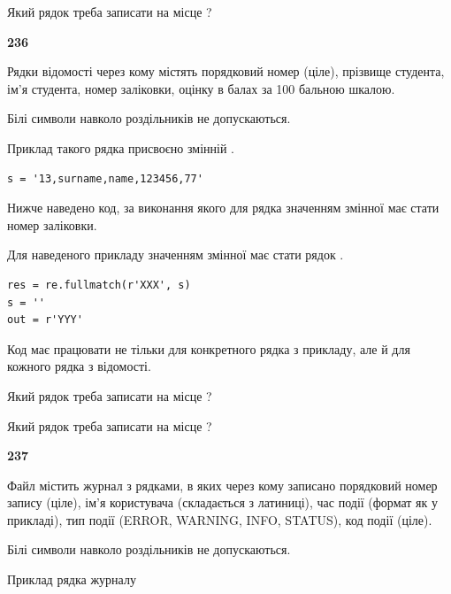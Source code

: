 Який рядок треба записати на місце  ?\par


\newpage

{\begin {center}\textbf{ 236}\end {center}}\par
Рядки відомості через кому містять порядковий номер (ціле), пріз\-ви\-ще студен\-та, ім'я студента, номер заліковки, оцінку в балах за 100 бальною шкалою.

Білі символи навколо роздільників не допускаються.

Приклад такого рядка присвоєно змінній .



\begin{verbatim}
s = '13,surname,name,123456,77'
\end{verbatim}


Нижче наведено код, за виконання якого для рядка  значенням змінної  має стати номер заліковки.

Для наведеного прикладу значенням змінної  має стати рядок  .



\begin{verbatim}
res = re.fullmatch(r'XXX', s)
s = ''
out = r'YYY'
\end{verbatim}


Код має працювати не тільки для конкретного рядка з прикладу, але й для кожного рядка з відомості.




Який рядок треба записати на місце  ?\par
\vspace{5mm}


Який рядок треба записати на місце  ?\par


\newpage

{\begin {center}\textbf{ 237}\end {center}}\par
Файл  містить журнал з рядками, в яких через кому записано поряд\-ко\-вий номер запису (ціле), ім'я користувача (складається з латиниці), час події (фор\-мат як у прикладі), тип події (ERROR, WARNING, INFO, STATUS), код події (ціле).

Білі символи навколо роздільників не допускаються.

Приклад рядка журналу



